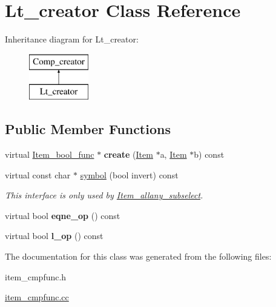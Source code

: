 \hypertarget{classLt__creator}{}\section{Lt\+\_\+creator Class Reference}
\label{classLt__creator}
Inheritance diagram for Lt\+\_\+creator\+:\begin{figure}[H]
\begin{center}
\leavevmode
\includegraphics[height=2.000000cm]{classLt__creator}
\end{center}
\end{figure}
\subsection*{Public Member Functions}
\begin{DoxyCompactItemize}
\item 
\mbox{\label{classLt__creator_a5718df9aacaa76adc812ec68ba48e0ea}} 
virtual \mbox{\hyperlink{classItem__bool__func}{Item\+\_\+bool\+\_\+func}} $\ast$ {\bfseries create} (\mbox{\hyperlink{classItem}{Item}} $\ast$a, \mbox{\hyperlink{classItem}{Item}} $\ast$b) const
\item 
\mbox{\label{classLt__creator_ad3fa34e94baf6d39138b9bfa2dc93ae0}} 
virtual const char $\ast$ \mbox{\hyperlink{classLt__creator_ad3fa34e94baf6d39138b9bfa2dc93ae0}{symbol}} (bool invert) const
\begin{DoxyCompactList}\small\item\em This interface is only used by \mbox{\hyperlink{classItem__allany__subselect}{Item\+\_\+allany\+\_\+subselect}}. \end{DoxyCompactList}\item 
\mbox{\label{classLt__creator_a92d6331d44d2feba18c1f112b9b19cb6}} 
virtual bool {\bfseries eqne\+\_\+op} () const
\item 
\mbox{\label{classLt__creator_a89c4afd7bd333762b678935dfd4cc687}} 
virtual bool {\bfseries l\+\_\+op} () const
\end{DoxyCompactItemize}


The documentation for this class was generated from the following files\+:\begin{DoxyCompactItemize}
\item 
item\+\_\+cmpfunc.\+h\item 
\mbox{\hyperlink{item__cmpfunc_8cc}{item\+\_\+cmpfunc.\+cc}}\end{DoxyCompactItemize}
